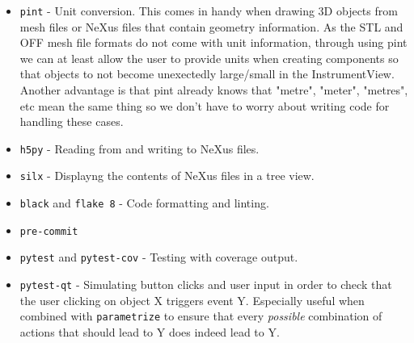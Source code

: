 \begin{itemize}
\item \texttt{pint} - Unit conversion. This comes in handy when drawing 3D objects from mesh files or NeXus files that contain geometry information. As the STL and OFF mesh file formats do not come with unit information, through using pint we can at least allow the user to provide units when creating components so that objects to not become unexectedly large/small in the InstrumentView. Another advantage is that pint already knows that "metre", "meter", "metres", etc mean the same thing so we don't have to worry about writing code for handling these cases.
\item \texttt{h5py} - Reading from and writing to NeXus files.
\item \texttt{silx} - Displayng the contents of NeXus files in a tree view.
\end{itemize}
\begin{itemize}
\item \texttt{black} and \texttt{flake 8} - Code formatting and linting.
\item \texttt{pre-commit} 
\item \texttt{pytest} and \texttt{pytest-cov} - Testing with coverage output.
\item \texttt{pytest-qt} - Simulating button clicks and user input in order to check that the user clicking on object X triggers event Y. Especially useful when combined with \texttt{parametrize} to ensure that every \textit{possible} combination of actions that should lead to Y does indeed lead to Y.
\end{itemize}
